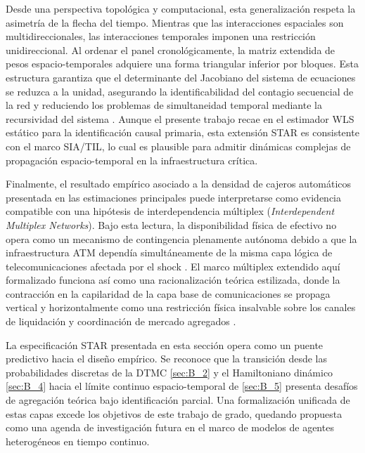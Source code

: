 Desde una perspectiva topol\'ogica y computacional, esta generalizaci\'on respeta la asimetr\'ia de la flecha del tiempo. Mientras que las interacciones espaciales son multidireccionales, las interacciones temporales imponen una restricci\'on unidireccional. Al ordenar el panel cronol\'ogicamente, la matriz extendida de pesos espacio-temporales adquiere una forma triangular inferior por bloques. Esta estructura garantiza que el determinante del Jacobiano del sistema de ecuaciones se reduzca a la unidad, asegurando la identificabilidad del contagio secuencial de la red y reduciendo los problemas de simultaneidad temporal mediante la recursividad del sistema \citep{ferman2019inference, mackinnon2020randomization}. Aunque el presente trabajo recae en el estimador WLS est\'atico para la identificaci\'on causal primaria, esta extensi\'on STAR es consistente con el marco SIA/TIL, lo cual es plausible para admitir din\'amicas complejas de propagaci\'on espacio-temporal en la infraestructura cr\'itica.

Finalmente, el resultado emp\'irico asociado a la densidad de cajeros autom\'aticos presentada en las estimaciones principales puede interpretarse como evidencia compatible con una hip\'otesis de interdependencia m\'ultiplex (\textit{Interdependent Multiplex Networks}). Bajo esta lectura, la disponibilidad f\'isica de efectivo no opera como un mecanismo de contingencia plenamente aut\'onoma debido a que la infraestructura ATM depend\'ia simult\'aneamente de la misma capa l\'ogica de telecomunicaciones afectada por el shock \citep{crouzet2023shocks}. El marco m\'ultiplex extendido aqu\'i formalizado funciona as\'i como una racionalizaci\'on te\'orica estilizada, donde la contracci\'on en la capilaridad de la capa base de comunicaciones se propaga vertical y horizontalmente como una restricci\'on f\'isica insalvable sobre los canales de liquidaci\'on y coordinaci\'on de mercado agregados \citep{alvarez2009financial}.

La especificaci\'on STAR presentada en esta secci\'on opera como un puente predictivo hacia el dise\~no emp\'irico. Se reconoce que la transici\'on desde las probabilidades discretas de la DTMC \ref{sec:B_2} y el Hamiltoniano din\'amico \ref{sec:B_4} hacia el l\'imite continuo espacio-temporal de \ref{sec:B_5} presenta desaf\'ios de agregaci\'on te\'orica bajo identificaci\'on parcial. Una formalizaci\'on unificada de estas capas excede los objetivos de este trabajo de grado, quedando propuesta como una agenda de investigaci\'on futura en el marco de modelos de agentes heterog\'eneos en tiempo continuo.

\newpage
\newpage
{}
\printbibliography
\label{sec:biblio}

